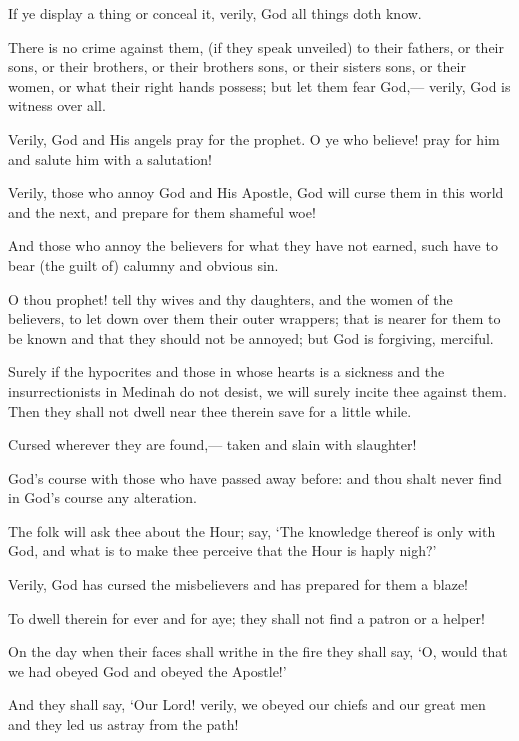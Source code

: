 \documentclass[fontsize=14pt, letterpaper, notitlepage, openany, DIV=12]{scrbook} %
\begin{document}
\noindent[33:54]
If ye display a thing or conceal it, verily, God all things doth know.

\noindent[33:55]
There is no crime against them, (if they speak unveiled) to their fathers, or their sons, or
their brothers, or their brothers sons, or their sisters sons, or their women, or what their right
hands possess; but let them fear God,--- verily, God is witness over all.

\noindent[33:56]
Verily, God and His angels pray for the prophet. O ye who believe! pray for him and
salute him with a salutation!

\noindent[33:57]
Verily, those who annoy God and His Apostle, God will curse them in this world and the
next, and prepare for them shameful woe!

\noindent[33:58]
And those who annoy the believers for what they have not earned, such have to bear (the
guilt of) calumny and obvious sin.

\noindent[33:59]
O thou prophet! tell thy wives and thy daughters, and the women of the believers, to let
down over them their outer wrappers; that is nearer for them to be known and that they should
not be annoyed; but God is forgiving, merciful.

\noindent[33:60]
Surely if the hypocrites and those in whose hearts is a sickness and the insurrectionists in
Medinah do not desist, we will surely incite thee against them. Then they shall not dwell near
thee therein save for a little while.

\noindent[33:61]
Cursed wherever they are found,--- taken and slain with slaughter!

\noindent[33:62]
God's course with those who have passed away before: and thou shalt never find in
God's course any alteration.

\noindent[33:63]
The folk will ask thee about the Hour; say, `The knowledge thereof is only with God, and
what is to make thee perceive that the Hour is haply nigh?'

\noindent[33:64]
Verily, God has cursed the misbelievers and has prepared for them a blaze!

\noindent[33:65]
To dwell therein for ever and for aye; they shall not find a patron or a helper!

\noindent[33:66]
On the day when their faces shall writhe in the fire they shall say, `O, would that we had
obeyed God and obeyed the Apostle!'

\noindent[33:67]
And they shall say, `Our Lord! verily, we obeyed our chiefs and our great men and they
led us astray from the path!
\end{document}
